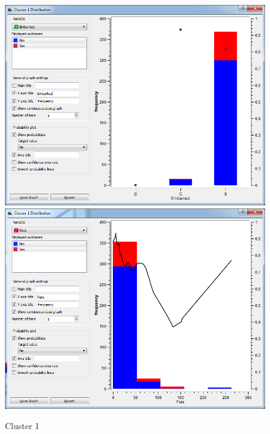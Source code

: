 \documentclass[a4paper,11pt]{article}
\begin{document}
\begin{figure}[h]
\begin{flushleft}
		\includegraphics[scale=0.30]{ClusterDistribution/Cluster1/Embarked}
		\includegraphics[scale=0.30]{ClusterDistribution/Cluster1/Fare}
	\end{flushleft}
	\caption{Cluster 1}
	\label{ClusterOne}
\end{figure}
\end{document}
